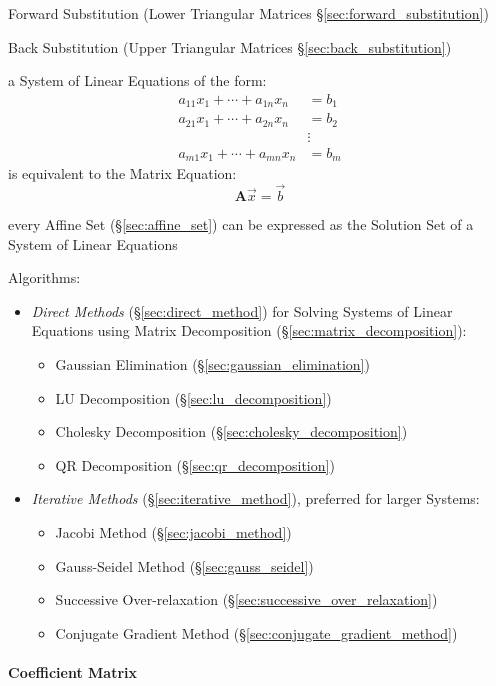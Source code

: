 Forward Substitution (Lower Triangular Matrices
\S\ref{sec:forward_substitution})

Back Substitution (Upper Triangular Matrices \S\ref{sec:back_substitution})

a System of Linear Equations of the form:
\begin{align*}
  a_{11}x_1 + \cdots + a_{1n}x_n & = b_1 \\
  a_{21}x_1 + \cdots + a_{2n}x_n & = b_2 \\
                                 & \vdots \\
  a_{m1}x_1 + \cdots + a_{mn}x_n & = b_m
\end{align*}
is equivalent to the Matrix Equation:
\[
  \mathbf{A}\vec{x} = \vec{b}
\]

every Affine Set (\S\ref{sec:affine_set}) can be expressed as the Solution Set
of a System of Linear Equations

Algorithms:
\begin{itemize}
\item \emph{Direct Methods} (\S\ref{sec:direct_method}) for Solving
  Systems of Linear Equations using Matrix Decomposition
  (\S\ref{sec:matrix_decomposition}):
  \begin{itemize}
    \item Gaussian Elimination (\S\ref{sec:gaussian_elimination})
    \item LU Decomposition (\S\ref{sec:lu_decomposition})
    \item Cholesky Decomposition (\S\ref{sec:cholesky_decomposition})
    \item QR Decomposition (\S\ref{sec:qr_decomposition})
  \end{itemize}
\item \emph{Iterative Methods} (\S\ref{sec:iterative_method}), preferred
  for larger Systems:
  \begin{itemize}
    \item Jacobi Method (\S\ref{sec:jacobi_method})
    \item Gauss-Seidel Method (\S\ref{sec:gauss_seidel})
    \item Successive Over-relaxation
      (\S\ref{sec:successive_over_relaxation})
    \item Conjugate Gradient Method
      (\S\ref{sec:conjugate_gradient_method})
  \end{itemize}
\end{itemize}



\paragraph{Coefficient Matrix}\label{sec:coefficient_matrix}\hfill

